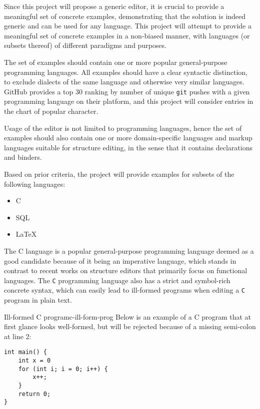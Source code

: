 \documentclass{article}
\begin{document}
Since this project will propose a generic editor, it is crucial to provide a meaningful set of concrete examples, demonstrating that the solution is indeed generic and can be used for any language.
This project will attempt to provide a meaningful set of concrete examples in a non-biased manner, with languages (or subsets thereof) of different paradigms and purposes. 

The set of examples should contain one or more popular general-purpose programming languages.
All examples should have a clear syntactic distinction, to exclude dialects of the same language and otherwise very similar languages. \\ GitHub provides a top 30 ranking\cite{prog-lang-metrics} by number of unique \texttt{git} pushes with a given programming language on their platform, and this project will consider entries in the chart of popular character.

Usage of the editor is not limited to programming languages, hence the set of examples should also contain one or more domain-specific languages and markup languages suitable for structure editing, in the sense that it contains declarations and binders.

Based on prior criteria, the project will provide examples for subsets of the following languages:
\begin{itemize}
    \item C 
    \item SQL 
    \item \LaTeX
\end{itemize}

The C language\cite{c-iso-standard} is a popular general-purpose programming language deemed as a good candidate because of it being an imperative language, which stands in contrast to recent works on structure editors\cite{aalborg}\cite{godiksen}\cite{omar} that primarily focus on functional languages. The \texttt{C} programming language also has a strict and symbol-rich concrete syntax, which can easily lead to ill-formed programs when editing a \texttt{C} program in plain text. 
\begin{example}{Ill-formed C program}{c-ill-form-prog}
Below is an example of a C program that at first glance looks well-formed, but will be rejected because of a missing semi-colon at line 2:
\begin{lstlisting}
int main() {
    int x = 0
    for (int i; i = 0; i++) {
        x++;
    }
    return 0;
}
\end{lstlisting}
\end{example}
\end{document}
